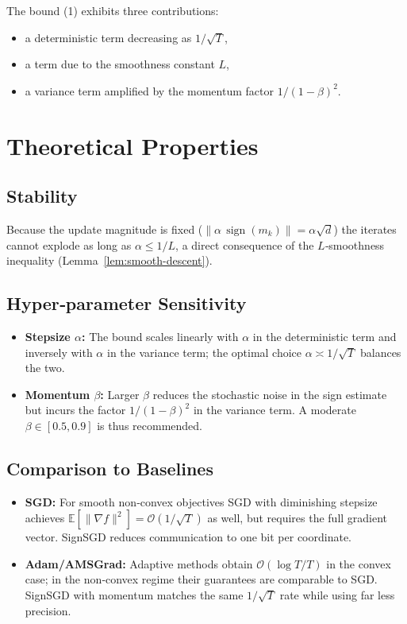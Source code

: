 \documentclass{article}
\newcommand{\E}{\mathbb{E}}
\newcommand{\sgn}{\operatorname{sign}}
\begin{document}
The bound (1) exhibits three contributions:
\begin{itemize}
\item a deterministic term decreasing as $1/\sqrt{T}$,
\item a term due to the smoothness constant $L$,
\item a variance term amplified by the momentum factor $1/(1-\beta)^{2}$.
\end{itemize}

\section*{Theoretical Properties}
\subsection*{Stability}
Because the update magnitude is fixed ($\|\alpha\,\sgn(m_{k})\|=\alpha\sqrt{d}$)
the iterates cannot explode as long as $\alpha\le 1/L$, a direct consequence
of the $L$‑smoothness inequality (Lemma~\ref{lem:smooth-descent}).

\subsection*{Hyper‑parameter Sensitivity}
\begin{itemize}
\item \textbf{Stepsize $\alpha$:} The bound scales linearly with $\alpha$ in the
deterministic term and inversely with $\alpha$ in the variance term; the optimal
choice $\alpha\asymp 1/\sqrt{T}$ balances the two.
\item \textbf{Momentum $\beta$:} Larger $\beta$ reduces the stochastic noise in the
sign estimate but incurs the factor $1/(1-\beta)^{2}$ in the variance term.
A moderate $\beta\in[0.5,0.9]$ is thus recommended.
\end{itemize}

\subsection*{Comparison to Baselines}
\begin{itemize}
\item \textbf{SGD:} For smooth non‑convex objectives SGD with diminishing stepsize
achieves $\E[\|\nabla f\|^{2}]=\mathcal{O}(1/\sqrt{T})$ as well, but requires the full
gradient vector. SignSGD reduces communication to one bit per coordinate.
\item \textbf{Adam/AMSGrad:} Adaptive methods obtain $\mathcal{O}(\log T/T)$ in the
convex case; in the non‑convex regime their guarantees are comparable to SGD.
SignSGD with momentum matches the same $1/\sqrt{T}$ rate while using far less
precision.
\end{itemize}
\end{document}

